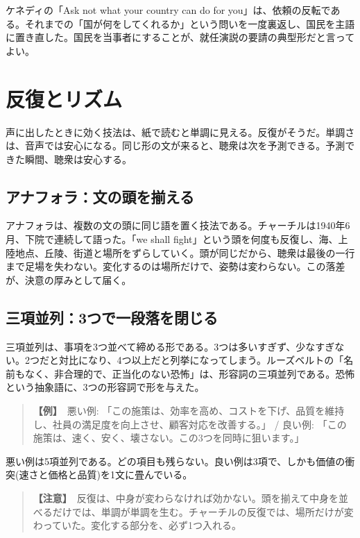 \documentclass{article}
\begin{document}
ケネディの「Ask not what your country can do for you」は、依頼の反転である。それまでの「国が何をしてくれるか」という問いを一度裏返し、国民を主語に置き直した。国民を当事者にすることが、就任演説の要請の典型形だと言ってよい。

\section{反復とリズム}

声に出したときに効く技法は、紙で読むと単調に見える。反復がそうだ。単調さは、音声では安心になる。同じ形の文が来ると、聴衆は次を予測できる。予測できた瞬間、聴衆は安心する。

\subsection{アナフォラ：文の頭を揃える}

アナフォラは、複数の文の頭に同じ語を置く技法である。チャーチルは1940年6月、下院で連続して語った。「we shall fight」という頭を何度も反復し、海、上陸地点、丘陵、街道と場所をずらしていく。頭が同じだから、聴衆は最後の一行まで足場を失わない。変化するのは場所だけで、姿勢は変わらない。この落差が、決意の厚みとして届く。

\subsection{三項並列：3つで一段落を閉じる}

三項並列は、事項を3つ並べて締める形である。3つは多いすぎず、少なすぎない。2つだと対比になり、4つ以上だと列挙になってしまう。ルーズベルトの「名前もなく、非合理的で、正当化のない恐怖」は、形容詞の三項並列である。恐怖という抽象語に、3つの形容詞で形を与えた。

\begin{quote}
\textbf{【例】}\ 悪い例: 「この施策は、効率を高め、コストを下げ、品質を維持し、社員の満足度を向上させ、顧客対応を改善する。」 / 良い例: 「この施策は、速く、安く、壊さない。この3つを同時に狙います。」
\end{quote}

悪い例は5項並列である。どの項目も残らない。良い例は3項で、しかも価値の衝突(速さと価格と品質)を1文に畳んでいる。

\begin{quote}
\textbf{【注意】}\ 反復は、中身が変わらなければ効かない。頭を揃えて中身を並べるだけでは、単調が単調を生む。チャーチルの反復では、場所だけが変わっていた。変化する部分を、必ず1つ入れる。
\end{quote}
\end{document}
